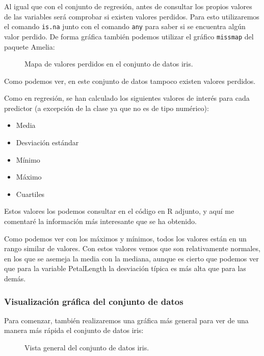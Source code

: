 Al igual que con el conjunto de regresión, antes de consultar los propios valores de las variables será comprobar si existen valores perdidos. Para esto utilizaremos el comando \texttt{is.na} junto con el comando \texttt{any} para saber si se encuentra algún valor perdido. De forma gráfica también podemos utilizar el gráfico \texttt{missmap} del paquete Amelia:


\begin{figure}[H]
	\centering
	
	\caption{Mapa de valores perdidos en el conjunto de datos iris.}
	\label{fig:missmap_iris}
\end{figure}

Como podemos ver, en este conjunto de datos tampoco existen valores perdidos.

Como en regresión, se han calculado los siguientes valores de interés para cada predictor (a excepción de la clase ya que no es de tipo numérico):

\begin{itemize}
	\item Media
	\item Desviación estándar
	\item Mínimo
	\item Máximo
	\item Cuartiles
\end{itemize}


Estos valores los podemos consultar en el código en R adjunto, y aquí me comentaré la información más interesante que se ha obtenido.

Como podemos ver con los máximos y mínimos, todos los valores están en un rango similar de valores. Con estos valores vemos que son relativamente normales, en los que se asemeja la media con la mediana, aunque es cierto que podemos ver que para la variable PetalLength la desviación típica es más alta que para las demás.

\subsubsection{Visualización gráfica del conjunto de datos}

Para comenzar, también realizaremos una gráfica más general para ver de una manera más rápida el conjunto de datos iris:

\begin{figure}[H]
	\centering
	
	\caption{Vista general del conjunto de datos iris.}
	\label{fig:vista_general_iris}
\end{figure}
